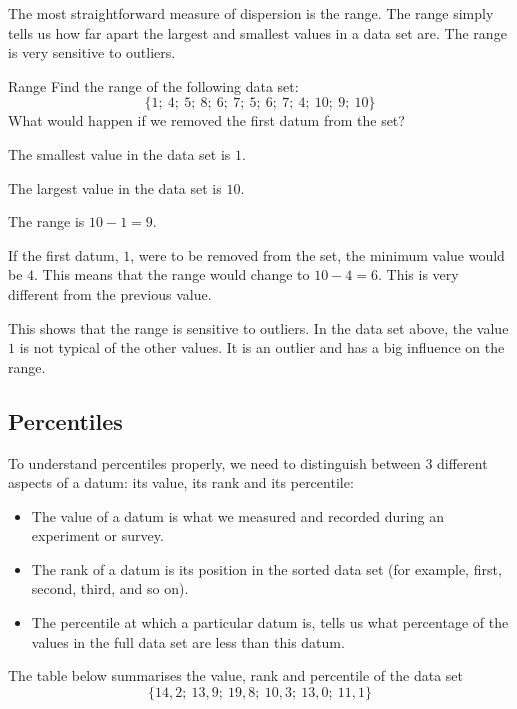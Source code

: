 The most straightforward measure of dispersion is the range. The range
simply tells us how far apart the largest and smallest values in a
data set are. The range is very sensitive to outliers.

\begin{wex}{Range}{
    Find the range of the following data set:
    \begin{equation*}
      \{1;\ 4;\ 5;\ 8;\ 6;\ 7;\ 5;\ 6;\ 7;\ 4;\ 10;\ 9;\ 10\}
    \end{equation*}
    What would happen if we removed the first datum from the set?
}{

  The smallest value in the data set is $1$.


  The largest value in the data set is $10$.


  The range is $10-1=9$.


 If the first datum, $1$, were to be
  removed from the set, the minimum value would be
  $4$. This means that the range would change to $10-4=6$. This is
  very different from the previous value.\par

  This shows that the range is sensitive to
  outliers. In the data set above, the value $1$ is not typical of
  the other values. It is an outlier and has a big influence on the
  range.

}
\end{wex}


\subsection{Percentiles}


To understand percentiles properly, we need to distinguish between $3$
different aspects of a datum: its value, its rank and its
percentile:
\begin{itemize}
 \item The value of a datum is what we measured and recorded
during an experiment or survey. 
\item The rank of a datum is its position in
the sorted data set (for example, first, second, third, and so
on). 
\item The percentile at which a particular datum is, tells us what
percentage of the values in the full data set are less than this
datum.
\end{itemize}
\par
  The table below summarises the value, rank and percentile of the
  data set
  \begin{equation*}
    \{14,2;\ 13,9;\ 19,8;\ 10,3;\ 13,0;\ 11,1\}
  \end{equation*}

